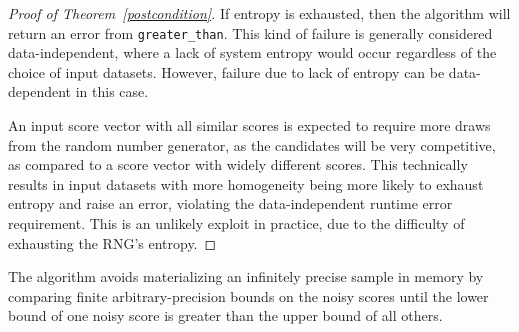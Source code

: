 \documentclass{article}
\begin{document}
\begin{proof}[Proof of Theorem~\ref{postcondition}]
    If entropy is exhausted, then the algorithm will return an error from \texttt{greater\_than}.
    This kind of failure is generally considered data-independent, where a lack of system entropy would occur regardless of the choice of input datasets.
    However, failure due to lack of entropy can be data-dependent in this case.

    An input score vector with all similar scores
    is expected to require more draws from the random number generator,
    as the candidates will be very competitive,
    as compared to a score vector with widely different scores.
    This technically results in input datasets with more homogeneity being more likely to exhaust entropy and raise an error,
    violating the data-independent runtime error requirement.
    This is an unlikely exploit in practice, due to the difficulty of exhausting the RNG's entropy.
\end{proof}

The algorithm avoids materializing an infinitely precise sample in memory by comparing finite arbitrary-precision bounds
on the noisy scores until the lower bound of one noisy score is greater than the upper bound of all others.
\end{document}

